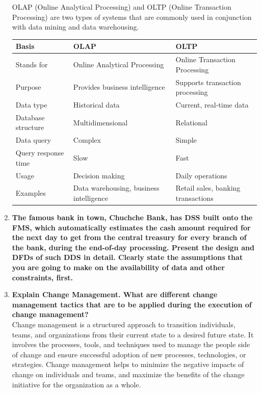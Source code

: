 \documentclass[12pt]{article}
\begin{document}
\begin{enumerate}
OLAP (Online Analytical Processing) and OLTP (Online Transaction Processing) are two types of systems that are commonly used in conjunction with data mining and data warehousing.
    {\centering \begin{longtable}{ |L{3cm}|L{4.5cm}|L{4.5cm}| }
        \hline
        Basis& OLAP & OLTP \\
        \hline
        Stands for & Online Analytical Processing & Online Transaction Processing \\
        \hline
        Purpose & Provides business intelligence & Supports transaction processing \\
        \hline
        Data type & Historical data & Current, real-time data \\
        \hline
        Database structure & Multidimensional & Relational \\
        \hline
        Data query & Complex & Simple \\
        \hline
        Query response time & Slow & Fast \\
        \hline
        Usage & Decision making & Daily operations \\
        \hline
        Examples & Data warehousing, business intelligence & Retail sales, banking transactions \\
        \hline
        \end{longtable}}
\item {\bfseries The famous bank in town, Chuchche Bank, has DSS built onto the FMS, which automatically estimates the cash amount required for the next day to get from the central treasury for every branch of the bank, during the end-of-day processing. Present the design and DFDs of such DDS in detail. Clearly state the assumptions that you are going to make on the availability of data and other constraints, first.}
    
\item {\bfseries Explain Change Management. What are different change management tactics that are to be applied during the execution of change management?\\}
Change management is a structured approach to transition individuals, teams, and organizations from their current state to a desired future state. It involves the processes, tools, and techniques used to manage the people side of change and ensure successful adoption of new processes, technologies, or strategies. Change management helps to minimize the negative impacts of change on individuals and teams, and maximize the benefits of the change initiative for the organization as a whole.
\begin{itemize}


\end{itemize}
\end{enumerate}
\end{document}
